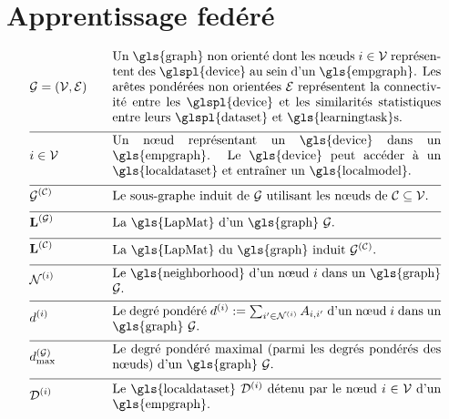 \newpage
\section*{Apprentissage fedéré}

\begin{align}
	&\graph = \pair{\nodes}{\edges} & \quad & \parbox{.75\textwidth}{Un \gls{graph} non orienté dont les nœuds $\nodeidx \in \nodes$ représentent des \glspl{device} au sein d’un \gls{empgraph}. Les arêtes pondérées non orientées $\edges$ représentent la connectivité entre les \glspl{device} et les similarités statistiques entre leurs \glspl{dataset} et \gls{learningtask}s.} \nonumber \\[2mm] \hline \nonumber\\[-5mm]
	&\nodeidx \in \nodes& \quad & \parbox{.75\textwidth}{Un nœud représentant un \gls{device} dans un \gls{empgraph}. Le \gls{device} peut accéder à un \gls{localdataset} et entraîner un \gls{localmodel}.} \nonumber \\[2mm] \hline \nonumber\\[-5mm]
	&\indsubgraph{\graph}{\cluster}& \quad & \parbox{.75\textwidth}{Le sous-graphe induit de $\graph$ utilisant les nœuds de $\cluster \subseteq \nodes$.} \nonumber \\[2mm] \hline \nonumber\\[-5mm]
	&\LapMat{\graph} & \quad & \parbox{.75\textwidth}{La \gls{LapMat} d’un \gls{graph} $\graph$.} \nonumber \\[2mm] \hline \nonumber\\[-5mm]
	&\LapMat{\cluster} & \quad & \parbox{.75\textwidth}{La \gls{LapMat} du \gls{graph} induit $\indsubgraph{\graph}{\cluster}$.} \nonumber \\[2mm] \hline \nonumber\\[-5mm]
	&\neighbourhood{\nodeidx} & \quad & \parbox{.75\textwidth}{Le \gls{neighborhood} d’un nœud $\nodeidx$ dans un \gls{graph} $\graph$.} \nonumber \\[2mm] \hline \nonumber\\[-5mm]
	&\nodedegree{\nodeidx} & \quad & \parbox{.75\textwidth}{Le degré pondéré $\nodedegree{\nodeidx}\defeq \sum_{\nodeidx' \in \neighbourhood{\nodeidx}} \edgeweight_{\nodeidx,\nodeidx'}$ d’un nœud $\nodeidx$ dans un \gls{graph} $\graph$.} \nonumber \\[2mm] \hline \nonumber\\[-5mm]
	&\maxnodedegree^{(\graph)} & \quad & \parbox{.75\textwidth}{Le degré pondéré maximal (parmi les degrés pondérés des nœuds) d’un \gls{graph} $\graph$.} \nonumber \\[2mm] \hline \nonumber\\[-5mm]
	&\localdataset{\nodeidx} & \quad & \parbox{.75\textwidth}{Le \gls{localdataset} $\localdataset{\nodeidx}$ détenu par le nœud $\nodeidx\in \nodes$ d’un \gls{empgraph}.} \nonumber 
\end{align}

